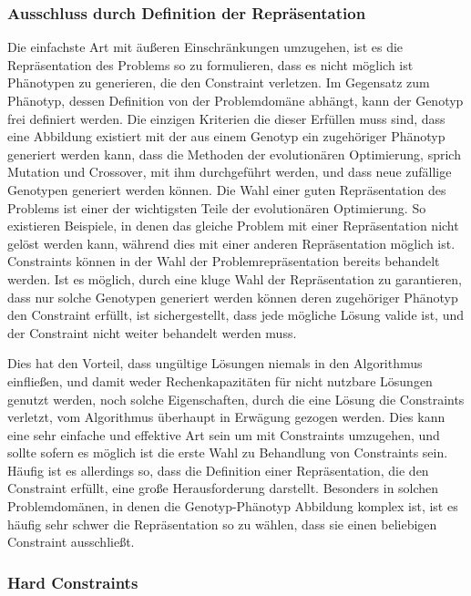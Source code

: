 \subsubsection{Ausschluss durch Definition der Repräsentation}

Die einfachste Art mit äußeren Einschränkungen umzugehen, ist es die Repräsentation des Problems so zu formulieren, dass es nicht möglich ist Phänotypen zu generieren, die den Constraint verletzen.
Im Gegensatz zum Phänotyp, dessen Definition von der Problemdomäne abhängt, kann der Genotyp frei definiert werden.
Die einzigen Kriterien die dieser Erfüllen muss sind, dass eine Abbildung existiert mit der aus einem Genotyp ein zugehöriger Phänotyp generiert werden kann, dass die Methoden der evolutionären Optimierung, sprich Mutation und Crossover, mit ihm durchgeführt werden, und dass neue zufällige Genotypen generiert werden können.
Die Wahl einer guten Repräsentation des Problems ist einer der wichtigsten Teile der evolutionären Optimierung.
So existieren Beispiele, in denen das gleiche Problem mit einer Repräsentation nicht gelöst werden kann, während dies mit einer anderen Repräsentation möglich ist.
Constraints können in der Wahl der Problemrepräsentation bereits behandelt werden.
Ist es möglich, durch eine kluge Wahl der Repräsentation zu garantieren, dass nur solche Genotypen generiert werden können deren zugehöriger Phänotyp den Constraint erfüllt, ist sichergestellt, dass jede mögliche Lösung valide ist, und der Constraint nicht weiter behandelt werden muss.

Dies hat den Vorteil, dass ungültige Lösungen niemals in den Algorithmus einfließen, und damit weder Rechenkapazitäten für nicht nutzbare Lösungen genutzt werden, noch solche Eigenschaften, durch die eine Lösung die Constraints verletzt, vom Algorithmus überhaupt in Erwägung gezogen werden.
Dies kann eine sehr einfache und effektive Art sein um mit Constraints umzugehen, und sollte sofern es möglich ist die erste Wahl zu Behandlung von Constraints sein.
Häufig ist es allerdings so, dass die Definition einer Repräsentation, die den Constraint erfüllt, eine große Herausforderung darstellt.
Besonders in solchen Problemdomänen, in denen die Genotyp-Phänotyp Abbildung komplex ist, ist es häufig sehr schwer die Repräsentation so zu wählen, dass sie einen beliebigen Constraint ausschließt.

\subsubsection{Hard Constraints}

